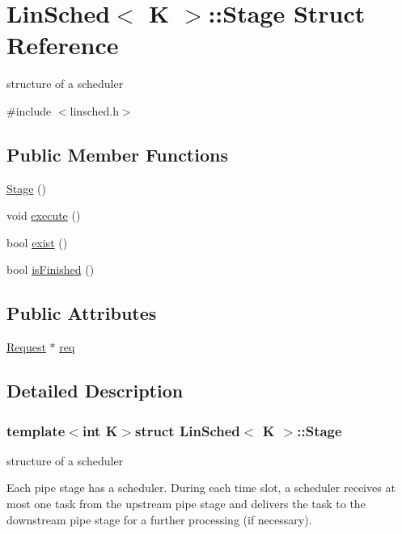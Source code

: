 \hypertarget{structLinSched_1_1Stage}{\section{Lin\-Sched$<$ K $>$\-:\-:Stage Struct Reference}
\label{structLinSched_1_1Stage}
}


structure of a scheduler  




{\ttfamily \#include $<$linsched.\-h$>$}

\subsection*{Public Member Functions}
\begin{DoxyCompactItemize}
\item 
\hyperlink{structLinSched_1_1Stage_a1e4341763fc70357367999ae7f9682c7}{Stage} ()
\item 
void \hyperlink{structLinSched_1_1Stage_a2e767f63c4ff0075840ae34406e23300}{execute} ()
\item 
bool \hyperlink{structLinSched_1_1Stage_a6e16d68a7c557c90508ed5c0bfdfec0a}{exist} ()
\item 
bool \hyperlink{structLinSched_1_1Stage_a6558188e3a26d6437ccab35484d02bff}{is\-Finished} ()
\end{DoxyCompactItemize}
\subsection*{Public Attributes}
\begin{DoxyCompactItemize}
\item 
\hyperlink{structLinSched_1_1Request}{Request} $\ast$ \hyperlink{structLinSched_1_1Stage_a9dcc76b40dedb5d6d49fc913989c1bd1}{req}
\end{DoxyCompactItemize}


\subsection{Detailed Description}
\subsubsection*{template$<$int K$>$struct Lin\-Sched$<$ K $>$\-::\-Stage}

structure of a scheduler 

Each pipe stage has a scheduler. During each time slot, a scheduler receives at most one task from the upstream pipe stage and delivers the task to the downstream pipe stage for a further processing (if necessary). 

